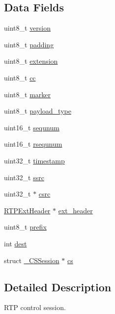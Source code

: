 \subsection*{Data Fields}
\begin{DoxyCompactItemize}
\item 
uint8\+\_\+t \hyperlink{struct___r_t_p_session_ab22abc2906422da61885ac6c8e6a1a59}{version}
\item 
uint8\+\_\+t \hyperlink{struct___r_t_p_session_a78a52d3de83ec4d91a7746456627089f}{padding}
\item 
uint8\+\_\+t \hyperlink{struct___r_t_p_session_a91c592cf70c61ba0788394767185be4c}{extension}
\item 
uint8\+\_\+t \hyperlink{struct___r_t_p_session_a622e15900f3d90f1391cf9812d1a8078}{cc}
\item 
uint8\+\_\+t \hyperlink{struct___r_t_p_session_ae00c35797c92d6f67470b088dc2c1876}{marker}
\item 
uint8\+\_\+t \hyperlink{struct___r_t_p_session_a9cdef377149cce5efd90b1e60596573a}{payload\+\_\+type}
\item 
uint16\+\_\+t \hyperlink{struct___r_t_p_session_afe208c7dec97b8f61e08094e61bf096e}{sequnum}
\item 
uint16\+\_\+t \hyperlink{struct___r_t_p_session_a1bef56c38f8d3bc3ab5d381e11c29d0d}{rsequnum}
\item 
uint32\+\_\+t \hyperlink{struct___r_t_p_session_ab20b0c7772544cf5d318507f34231fbe}{timestamp}
\item 
uint32\+\_\+t \hyperlink{struct___r_t_p_session_a7728cdfcf33cc14c0d7ba2dcdcbcdf2e}{ssrc}
\item 
uint32\+\_\+t $\ast$ \hyperlink{struct___r_t_p_session_a8bbd14e68a057e6de8ba3fa4c6afd4fa}{csrc}
\item 
\hyperlink{rtp_8h_ab384df54f92f379aa578740b96a3aaaa}{R\+T\+P\+Ext\+Header} $\ast$ \hyperlink{struct___r_t_p_session_aa0a69d899b1bee283ae1490f53bcd073}{ext\+\_\+header}
\item 
uint8\+\_\+t \hyperlink{struct___r_t_p_session_acf4a7a7457f3d922d7118075fc1a300b}{prefix}
\item 
int \hyperlink{struct___r_t_p_session_ae5163ff230abd4115d86194ad89467b5}{dest}
\item 
struct \hyperlink{struct___c_s_session}{\+\_\+\+C\+S\+Session} $\ast$ \hyperlink{struct___r_t_p_session_a6fa710f1d7103d0f7b2b872e33aac143}{cs}
\end{DoxyCompactItemize}


\subsection{Detailed Description}
R\+T\+P control session. 

